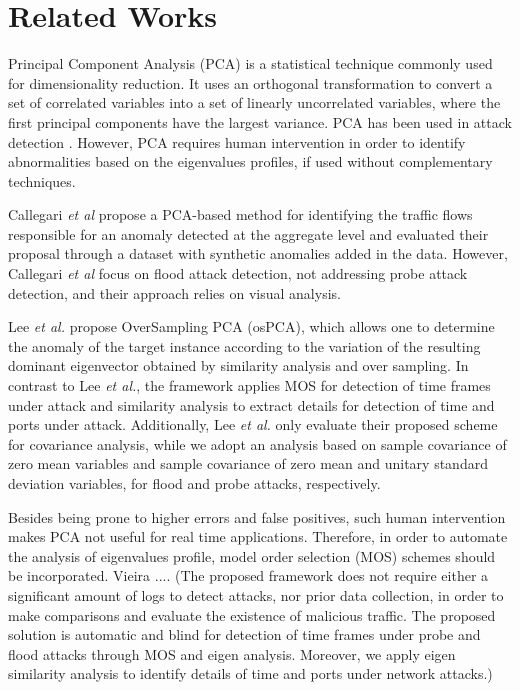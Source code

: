 \documentclass[review]{elsarticle}
\begin{document}
\section{Related Works}
\label{sec:relatedworks}

Principal Component Analysis (PCA) is a statistical technique commonly used for dimensionality reduction. It uses an orthogonal transformation to convert a set of correlated variables into a set of linearly uncorrelated variables, where the first principal components have the largest variance. PCA has been used in attack detection \cite{almotairi2009technique}. However, PCA requires human intervention in order to identify abnormalities based on the eigenvalues profiles, if used without complementary techniques.

Callegari \emph{et al} \cite{Zonglin2009} propose a PCA-based method for identifying the traffic flows responsible for an anomaly detected at the aggregate level and evaluated their proposal through a dataset with synthetic anomalies added in the data. However, Callegari \emph{et al} focus on flood attack detection, not addressing probe attack detection, and their approach relies on visual analysis. 

Lee \emph{et al.} \cite{Lee2013} propose OverSampling PCA (osPCA), which allows one to determine the anomaly of the target instance according to the variation of the resulting dominant eigenvector obtained by similarity analysis and over sampling. In contrast to Lee \emph{et al.}, the framework applies MOS for detection of time frames under attack and similarity analysis to extract details for detection of time and ports under attack. Additionally, Lee \emph{et al.} only evaluate their proposed scheme for covariance analysis, while we adopt an analysis based on sample covariance of zero mean variables and sample covariance of zero mean and unitary standard deviation variables, for flood and probe attacks, respectively. 

Besides being prone to higher errors and false positives, such human intervention makes PCA not useful for real time applications. Therefore, in order to automate the analysis of eigenvalues profile, model order selection (MOS) schemes should be incorporated. Vieira .... (The proposed framework does not require either a significant amount of logs to detect attacks, nor prior data collection, in order to make comparisons and evaluate the existence of malicious traffic. The proposed solution is automatic and blind for detection of time frames under probe and flood attacks through MOS and eigen analysis. Moreover, we apply eigen similarity analysis to identify details of time and ports under network attacks.)
\end{document}
